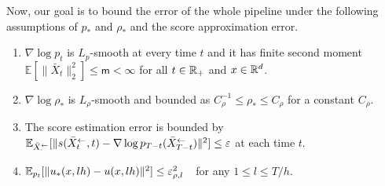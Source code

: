 Now, our goal is to bound the error of the whole pipeline under the following assumptions of $p_*$ and $\rho_*$ and the score approximation error.
\begin{assumption}\label{assumption:TVBoundMainText-2}
\begin{enumerate}[topsep=0mm,itemsep=-1mm,leftmargin = 6mm]
\item 
    $\nabla \log p_t$ is $L_p$-smooth at every time $t$ and it has finite second moment $\mathbb{E}[\|\bar{X}_t\|^2_2] \leq \mathsf{m} < \infty$ for all $t\in \mathbb{R}_+$ and $x\in \mathbb{R}^d$. 
\item  $\nabla \log \rho_*$ is $L_\rho$-smooth and bounded as $C_\rho^{-1}\leq \rho_* \leq C_\rho$ for a constant $C_\rho$.
\item   The score estimation error is bounded by 
\revisedStart
$\mathbb{E}_{\bar{X}_{\cdot}^{\leftarrow}}[\|s(\bar{X}_{t}^{\leftarrow},t)-\nabla \log p_{T-t}(\bar{X}_{T-t}^{\leftarrow})\|^2]\leq \varepsilon$ 
\revisedEnd
at each time $t$. 
\item 
$\mathbb{E}_{p_t}[\|u_*(x,lh) - u(x,lh)\|^2] \leq \varepsilon_{\rho,l}^2$~~for any $1 \leq l \leq T/h$.
\end{enumerate}
\end{assumption}


